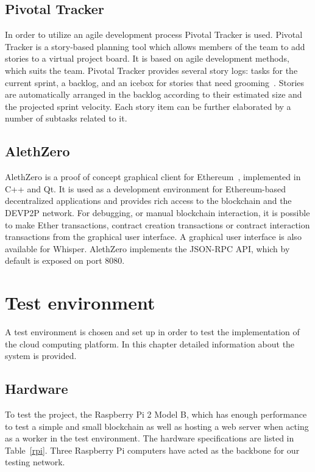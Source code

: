 \subsection{Pivotal Tracker}
In order to utilize an agile development process Pivotal Tracker is used. Pivotal Tracker is a story-based planning tool which allows members of the team to add stories to a virtual project board. It is based on agile development methods, which suits the team. Pivotal Tracker provides several story logs: tasks for the current sprint, a backlog, and an icebox for stories that need grooming~\cite{pivotaltracker}. Stories are automatically arranged in the backlog according to their estimated size and the projected sprint velocity. Each story item can be further elaborated by a number of subtasks related to it. 

\subsection{AlethZero}
AlethZero is a proof of concept graphical client for Ethereum~\cite{github-alethzero}, implemented in C++ and Qt. It is used as a development environment for Ethereum-based decentralized applications and provides rich access to the blockchain and the DEVP2P network. For debugging, or manual blockchain interaction, it is possible to make Ether transactions, contract creation transactions or contract interaction transactions from the graphical user interface. A graphical user interface is also available for Whisper. AlethZero implements the JSON-RPC API, which by default is exposed on port 8080.

\section{Test environment}
A test environment is chosen and set up in order to test the implementation of the cloud computing platform. In this chapter detailed information about the system is provided.

\subsection{Hardware}
To test the project, the Raspberry Pi 2 Model B, which has enough performance to test a simple and small blockchain as well as hosting a web server when acting as a worker in the test environment. The hardware specifications are listed in Table~\ref{rpi}. Three Raspberry Pi computers have acted as the backbone for our testing network.

